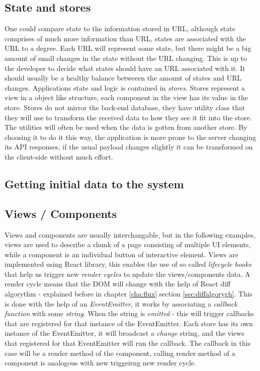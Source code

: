 \subsection*{State and stores}
One could compare state to the information stored in URL, although state comprises of much more information than URL, states are associated with the URL to a degree. Each URL will represent some state, but there might be a big amount of small changes in the state without the URL changing. This is up to the developer to decide what states should have an URL associated with it. It should usually be a healthy balance betweeen the amount of states and URL changes.
Applications state and logic is contained in \emph{stores}. Stores represent a view in a object like structure, each component in the view has its value in the store. Stores do not mirror the back-end database, they have utility class that they will use to transform the received data to how they see it fit into the store. The utilities will often be used when the data is gotten from another store. By choosing it to do it this way, the application is more prone to the server changing its API responses, if the usual payload changes slightly it can be transformed on the client-side without much effort.

\subsection*{Getting initial data to the system}

\subsection*{Views / Components}
Views and components are usually interchangable, but in the following examples, views are used to describe a chunk of a page consisting of multiple UI elements, while a component is an individual button of interactive element. Views are implemented using React library, this enables the use of so called \emph{lifecycle hooks} that help us trigger new \emph{render cycles} to update the views/components data. A render cycle means that the DOM will change with the help of React diff algorythm - explained before in chapter \ref{cha:flux} section \ref{sec:diffalgorygh}. This is done with the help of an \emph{EventEmitter}, it works by associating a \emph{callback function} with some \emph{string}. When the string is \emph{emitted} - this will trigger callbacks that are registered for that instance of the EventEmitter. Each store has its own instance of the EventEmitter, it will broadcast a \emph{change} string, and the views that registered for that EventEmitter will run the callback. The callback in this case will be a render method of the component, calling render method of a component is analogous with new triggeirng new render cycle.

